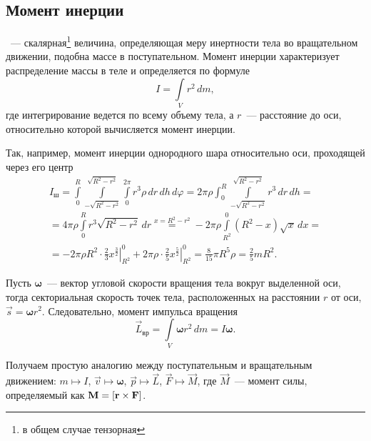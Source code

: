 \subsection{Момент инерции}
\label{sec:inertia-moment}

~--- скалярная\footnote{в общем случае тензорная} величина, определяющая меру инертности тела во вращательном движении, подобна массе в поступательном. Момент инерции характеризует распределение массы в теле и определяется по формуле
\begin{equation}
    I = \int\limits_{V} r^2 \,d m,
\end{equation}
где интегрирование ведется по всему объему тела, а $r$~--- расстояние до оси, относительно которой вычисляется момент инерции.

Так, например, момент инерции однородного шара относительно оси, проходящей через его центр
\begin{multline*}
    I_\text{ш} = \int\limits_0^R \int\limits_{-\sqrt{R^2 - r^2}}^{\sqrt{R^2 - r^2}} \int\limits_0^{2\pi} r^3 \rho \,dr \,dh \,d\varphi 
    = 2\pi \rho \int_0^R \int\limits_{-\sqrt{R^2 - r^2}}^{\sqrt{R^2 - r^2}} r^3 \,dr \,dh = \\
    = 4\pi \rho \int\limits_0^R r^3 \sqrt{R^2 - r^2} \,dr
    \overset{x = R^2 - r^2}{=} -2\pi \rho \int\limits_{R^2}^0 (R^2 - x) \sqrt{x} \, dx = \\
    = - 2\pi \rho R^2 \cdot \left. \frac{2}{3}  x^\frac{3}{2} \right|_{R^2}^0 + 2\pi \rho \cdot \left. \frac{2}{5} x^\frac{5}{2} \right|_{R^2}^0
    = \frac{8}{15} \pi R^5 \rho = \frac{2}{5} m R^2.
\end{multline*}

Пусть $\boldsymbol{\omega}$~--- вектор угловой скорости вращения тела вокруг выделенной оси, тогда секториальная скорость точек тела, расположенных на расстоянии $r$ от оси, $\vec{s} = \boldsymbol{\omega} r^2$. Следовательно, момент импульса вращения 
\begin{equation*}
    \vec{L}_\text{вр} = \int\limits_{V} \boldsymbol{\omega} r^2 \,d m = I\boldsymbol{\omega}.
\end{equation*}

Получаем простую аналогию между поступательным и вращательным движением:
$m \longmapsto I$, $\vec v \longmapsto \boldsymbol\omega$, $\vec{p} \longmapsto \vec{L}$, $\vec F \longmapsto \vec M$, где $\vec{M}$~--- момент силы, определяемый как $\mathbf{M} = \left[\mathbf{r} \times \mathbf{F}\right]$.
